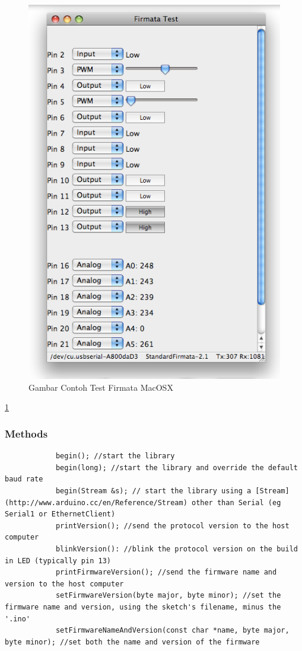 	\begin{figure} [ht]
		\centerline{\includegraphics[width=1\textwidth]{figures/firmatates.png}}
		\caption{Gambar Contoh Test Firmata MacOSX}
		\label{firmatates}
	\end{figure}
	
	\ref{firmatates}
	
	\subsubsection{Methods}
		\begin{verbatim}
			begin(); //start the library
			begin(long); //start the library and override the default baud rate
			begin(Stream &s); // start the library using a [Stream](http://www.arduino.cc/en/Reference/Stream) other than Serial (eg Serial1 or EthernetClient)
			printVersion(); //send the protocol version to the host computer
			blinkVersion(): //blink the protocol version on the build in LED (typically pin 13)
			printFirmwareVersion(); //send the firmware name and version to the host computer
			setFirmwareVersion(byte major, byte minor); //set the firmware name and version, using the sketch's filename, minus the '.ino'
			setFirmwareNameAndVersion(const char *name, byte major, byte minor); //set both the name and version of the firmware
		\end{verbatim}
	
